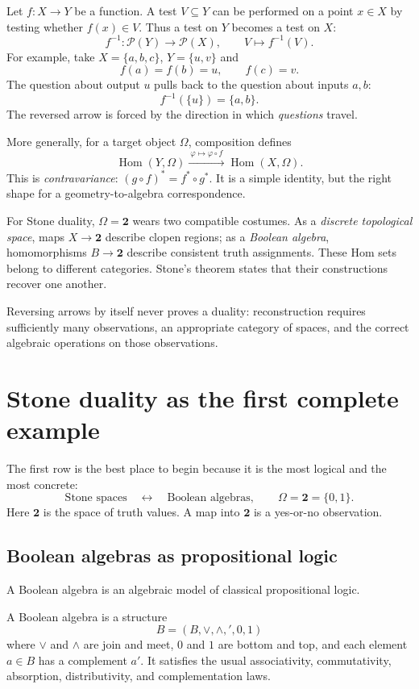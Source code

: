 Let $f:X\to Y$ be a function. A test $V\subseteq Y$ can be performed on a point $x\in X$ by testing whether $f(x)\in V$. Thus a test on $Y$ becomes a test on $X$:
\[
 f^{-1}:\mathcal P(Y)\longrightarrow\mathcal P(X),
 \qquad V\longmapsto f^{-1}(V).
\]
For example, take $X=\{a,b,c\}$, $Y=\{u,v\}$ and
\[
 f(a)=f(b)=u,\qquad f(c)=v.
\]
The question about output $u$ pulls back to the question about inputs $a,b$:
\[
 f^{-1}(\{u\})=\{a,b\}.
\]
The reversed arrow is forced by the direction in which \emph{questions} travel.

More generally, for a target object $\Omega$, composition defines
\[
 \operatorname{Hom}(Y,\Omega)
 \xrightarrow{\ \varphi\mapsto\varphi\circ f\ }
 \operatorname{Hom}(X,\Omega).
\]
This is \emph{contravariance}: $(g\circ f)^*=f^*\circ g^*$.
It is a simple identity, but the right shape for a geometry-to-algebra correspondence.

For Stone duality, $\Omega=\mathbf2$ wears two compatible costumes. As a \emph{discrete topological space}, maps $X\to\mathbf2$ describe clopen regions; as a \emph{Boolean algebra}, homomorphisms $B\to\mathbf2$ describe consistent truth assignments. These Hom sets belong to different categories. Stone's theorem states that their constructions recover one another.

Reversing arrows by itself never proves a duality: reconstruction requires sufficiently many observations, an appropriate category of spaces, and the correct algebraic operations on those observations.

\section{Stone duality as the first complete example}

The first row is the best place to begin because it is the most logical and the most concrete:
\[
  \text{Stone spaces}\quad \longleftrightarrow\quad \text{Boolean algebras},
  \qquad
  \Omega=\mathbf 2=\{0,1\}.
\]
Here \(\mathbf 2\) is the space of truth values.  A map into \(\mathbf 2\) is a yes-or-no observation.

\subsection{Boolean algebras as propositional logic}

A Boolean algebra is an algebraic model of classical propositional logic.

\begin{definition}
A Boolean algebra is a structure
\[
  B=(B,\vee,\wedge,{}',0,1)
\]
where \(\vee\) and \(\wedge\) are join and meet, \(0\) and \(1\) are bottom and top, and each element \(a\in B\) has a complement \(a'\).  It satisfies the usual associativity, commutativity, absorption, distributivity, and complementation laws.
\end{definition}

